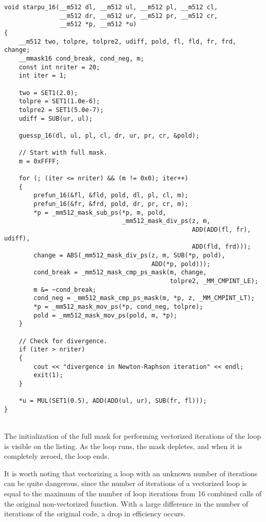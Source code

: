 \documentclass[
11pt,%
tightenlines,%
twoside,%
onecolumn,%
nofloats,%
nobibnotes,%
nofootinbib,%
superscriptaddress,%
noshowpacs,%
centertags]%
{revtex4}
\begin{document}
\begin{lstlisting}[caption={Vectorized version of \texttt{starpu}.},label={lst:prac_riemann_starpu_vec}]
void starpu_16(__m512 dl, __m512 ul, __m512 pl, __m512 cl,
               __m512 dr, __m512 ur, __m512 pr, __m512 cr,
               __m512 *p, __m512 *u)
{
    __m512 two, tolpre, tolpre2, udiff, pold, fl, fld, fr, frd, change;
    __mmask16 cond_break, cond_neg, m;
    const int nriter = 20;
    int iter = 1;

    two = SET1(2.0);
    tolpre = SET1(1.0e-6);
    tolpre2 = SET1(5.0e-7);
    udiff = SUB(ur, ul);

    guessp_16(dl, ul, pl, cl, dr, ur, pr, cr, &pold);

    // Start with full mask.
    m = 0xFFFF;

    for (; (iter <= nriter) && (m != 0x0); iter++)
    {
        prefun_16(&fl, &fld, pold, dl, pl, cl, m);
        prefun_16(&fr, &frd, pold, dr, pr, cr, m);
        *p = _mm512_mask_sub_ps(*p, m, pold,
                                _mm512_mask_div_ps(z, m,
                                                   ADD(ADD(fl, fr), udiff),
                                                   ADD(fld, frd)));
        change = ABS(_mm512_mask_div_ps(z, m, SUB(*p, pold),
                                        ADD(*p, pold)));
        cond_break = _mm512_mask_cmp_ps_mask(m, change,
                                             tolpre2, _MM_CMPINT_LE);
        m &= ~cond_break;
        cond_neg = _mm512_mask_cmp_ps_mask(m, *p, z, _MM_CMPINT_LT);
        *p = _mm512_mask_mov_ps(*p, cond_neg, tolpre);
        pold = _mm512_mask_mov_ps(pold, m, *p);
    }

    // Check for divergence.
    if (iter > nriter)
    {
        cout << "divergence in Newton-Raphson iteration" << endl;
        exit(1);
    }

    *u = MUL(SET1(0.5), ADD(ADD(ul, ur), SUB(fr, fl)));
}
\end{lstlisting}

\ \\

The initialization of the full mask for performing vectorized iterations of the loop is visible on the listing.
As the loop runs, the mask depletes, and when it is completely zeroed, the loop ends.

It is worth noting that vectorizing a loop with an unknown number of iterations can be quite dangerous, since the number of iterations of a vectorized loop is equal to the maximum of the number of loop iterations from 16 combined calls of the original non-vectorized function.
With a large difference in the number of iterations of the original code, a drop in efficiency occurs.
\end{document}
